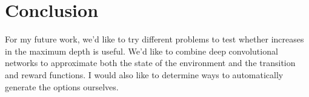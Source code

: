 \section{Conclusion}
For my future work, we'd like to try different problems to test whether increases in the maximum depth is useful. We'd like to combine deep convolutional networks to approximate both the state of the environment and the transition and reward functions. I would also like to determine ways to automatically generate the options ourselves.
